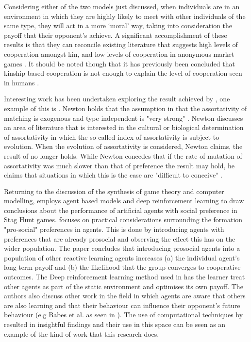 \documentclass[11pt]{book}
\newcommand*{\np}{\par\noindent\newline}
\begin{document}
\np Considering either of the two models just discussed, when individuals are in an environment in which they are highly likely
to meet with other individuals of the same type, they will act in a more `moral' way, taking into consideration the
payoff that their opponent's achieve. A significant accomplishment of these results is that they can reconcile existing
literature that suggests high levels of cooperation amongst kin, and low levels of cooperation in anonymous market games \citep[See ][~p. 2296]{alger_homo_2013}. 
It should be noted though that it has previously been concluded that kinship-based cooperation is not enough to explain the level of cooperation seen in humans \citep{van_veelen_why_2006}. 

\np Interesting work has been undertaken exploring the result achieved by \citet{alger_homo_2013}, one example of this
is \citet{newton_preferences_2017}. Newton holds that the assumption in \citet{alger_homo_2013} that the assortativity
of matching is exogenous and type independent is "very strong" \citep{newton_preferences_2017}. Newton discusses an area
of literature that is interested in the cultural or biological determination of assortativity in which the
so called index of assortativity is subject to evolution. When the evolution of assortativity is considered, Newton
claims, the result of \citet{alger_homo_2013} no longer holds. While Newton concedes that if the rate of mutation of
assortativity was much slower than that of preference the result may hold, he claims that situations in which this is
the case are "difficult to conceive" \citep{newton_preferences_2017}.

\np Returning to the discussion of the synthesis of game theory and computer modelling, \citet{peysakhovich_prosocial_2017} employs agent based models and deep reinforcement learning to draw conclusions about the performance of artificial agents with social preference in Stag Hunt games.
\citet{peysakhovich_prosocial_2017} focuses on practical considerations surrounding the formation "pro-social" preferences in agents.
This is done by introducing agents with preferences that are already prosocial and observing the effect this has on the wider population.
The paper concludes that introducing prosocial agents into a population of other reactive learning agents increases 
(a) the individual agent's long-term payoff and 
(b) the likelihood that the group converges to cooperative outcomes. 
The Deep reinforcement learning method used in \citet{peysakhovich_prosocial_2017} has the learner treat other agents as part of the static environment and optimises its own payoff. The authors also discuss other work in the field in which agents are aware that others are also learning and that their behaviour can influence their opponent's future behaviour (e.g Babes et al. as seen in \citealt{peysakhovich_prosocial_2017}).
The use of computational techniques by \citet{peysakhovich_prosocial_2017} resulted in insightful findings and their use in this space can be seen as an example of the kind of work that this research does.
\end{document}
